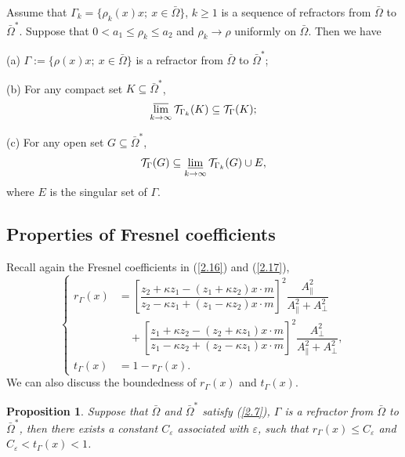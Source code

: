 \documentclass[a4paper,12pt,]{article}
\newtheorem{lemma}{\hskip\parindent\bf Lemma}[section]%
\newtheorem{proposition}{\bf Proposition}[section]%
\numberwithin{equation}{section}
\numberwithin{equation}{section} \allowdisplaybreaks
\begin{document}
\begin{lemma}
  Assume that $\Gamma_{k} = \{\rho_{k}(x)x;~x\in \bar{\Omega}\}$, $k \geq 1$ is a sequence of refractors from $\bar{\Omega}$ to $\bar{\Omega}^{\ast}$. Suppose that $0<a_{1}\leq \rho_{k} \leq a_{2}$ and $\rho_{k} \rightarrow \rho$ uniformly on $\bar{\Omega}$. Then we have
  
   (a) $\Gamma := \{\rho(x)x;~x\in \bar{\Omega}\}$ is a refractor from $\bar{\Omega}$ to $\bar{\Omega}^{\ast}$;
  
   (b) For any compact set $K\subseteq \bar{\Omega}^{\ast}$,
  $$\varlimsup_{k\rightarrow \infty} \mathcal{T}_{\Gamma_{k}}(K) \subseteq \mathcal{T}_{\Gamma}(K);$$
  
   (c) For any open set $G \subseteq \bar{\Omega}^{\ast}$,
  $$\mathcal{T}_{\Gamma}(G) \subseteq \varliminf_{k\rightarrow \infty}\mathcal{T}_{\Gamma_{k}}(G) \cup E,$$
  where $E$ is the singular set of $\Gamma$.
  \label{lem4.6}
\end{lemma}

\subsection{Properties of Fresnel coefficients}

Recall again the Fresnel coefficients in (\ref{2.16}) and (\ref{2.17}),
\begin{equation*}
  \begin{cases}
    r_{\Gamma}(x) \!\!\!\!&= \left[\dfrac{z_{2} + \kappa z_{1} - (z_{1} + \kappa z_{2}) x \cdot m}{z_{2} - \kappa z_{1} + (z_{1} - \kappa z_{2}) x \cdot m} \right]^{2} \dfrac{A_{\parallel}^{2}}{A_{\parallel}^{2} + A_{\bot}^{2}} \\
    \!\!\!\!&\quad+ \left[ \dfrac{z_{1} + \kappa z_{2} - (z_{2} + \kappa z_{1}) x \cdot m}{z_{1} - \kappa z_{2} + (z_{2} - \kappa z_{1}) x \cdot m}\right]^{2} \dfrac{A_{\bot}^{2}}{A_{\parallel}^{2} + A_{\bot}^{2}},  \\
    t_{\Gamma}(x) \!\!\!\!&= 1 - r_{\Gamma}(x).
  \end{cases}
\end{equation*}
We can also discuss the boundedness of $r_{\Gamma}(x)$ and $t_{\Gamma}(x)$.

\begin{proposition}
  Suppose that $\bar{\Omega}$ and $\bar{\Omega}^{\ast}$ satisfy (\ref{2.7}), $\Gamma$ is a refractor from $\bar{\Omega}$ to $\bar{\Omega}^{\ast}$, then there exists a constant $C_{\varepsilon}$ associated with $\varepsilon$, such that $r_{\Gamma}(x) \leq C_{\varepsilon}$ and $C_{\varepsilon} < t_{\Gamma}(x) <1$.
  \label{prop4.1}
\end{proposition}
\end{document}
